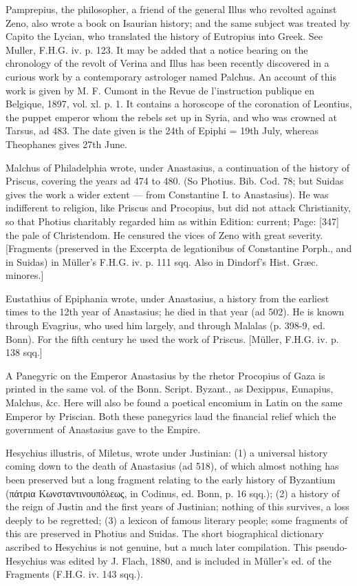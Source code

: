 Pamprepius, the philosopher, a friend of the general Illus who revolted against Zeno, also wrote a book on Isaurian history; and the same subject was treated by Capito the Lycian, who translated the history of Eutropius into Greek. See Muller, F.H.G. iv. p. 123. It may be added that a notice bearing on the chronology of the revolt of Verina and Illus has been recently discovered in a curious work by a contemporary astrologer named Palchus. An account of this work is given by M. F. Cumont in the Revue de l\texthebrew{}’instruction publique en Belgique, 1897, vol. xl. p. 1. It contains a horoscope of the coronation of Leontius, the puppet emperor whom the rebels set up in Syria, and who was crowned at Tarsus, ad 483. The date given is the 24th of Epiphi = 19th July, whereas Theophanes gives 27th June.

Malchus of Philadelphia wrote, under Anastasius, a continuation of the history of Priscus, covering the years ad 474 to 480. (So Photius. Bib. Cod. 78; but Suidas gives the work a wider extent \texthebrew{—} from Constantine I. to Anastasius). He was indifferent to religion, like Priscus and Procopius, but did not attack Christianity, so that Photius charitably regarded him as within Edition: current; Page: [347] the pale of Christendom. He censured the vices of Zeno with great severity. [Fragments (preserved in the Excerpta de legationibus of Constantine Porph., and in Suidas) in Müller\texthebrew{}’s F.H.G. iv. p. 111 sqq. Also in Dindorf\texthebrew{}’s Hist. Græc. minores.]

Eustathius of Epiphania wrote, under Anastasius, a history from the earliest times to the 12th year of Anastasius; he died in that year (ad 502). He is known through Evagrius, who used him largely, and through Malalas (p. 398-9, ed. Bonn). For the fifth century he used the work of Priscus. [Müller, F.H.G. iv. p. 138 sqq.]

A Panegyric on the Emperor Anastasius by the rhetor Procopius of Gaza is printed in the same vol. of the Bonn. Script. Byzant., as Dexippus, Eunapius, Malchus, \&c. Here will also be found a poetical encomium in Latin on the same Emperor by Priscian. Both these panegyrics laud the financial relief which the government of Anastasius gave to the Empire.

Hesychius illustris, of Miletus, wrote under Justinian: (1) a universal history coming down to the death of Anastasius (ad 518), of which almost nothing has been preserved but a long fragment relating to the early history of Byzantium (\textgreek{πάτρια Κωνσταντινουπόλεως}, in Codinus, ed. Bonn, p. 16 sqq.); (2) a history of the reign of Justin and the first years of Justinian; nothing of this survives, a loss deeply to be regretted; (3) a lexicon of famous literary people; some fragments of this are preserved in Photius and Suidas. The short biographical dictionary ascribed to Hesychius is not genuine, but a much later compilation. This pseudo-Hesychius was edited by J. Flach, 1880, and is included in Müller\texthebrew{}’s ed. of the Fragments (F.H.G. iv. 143 sqq.).

